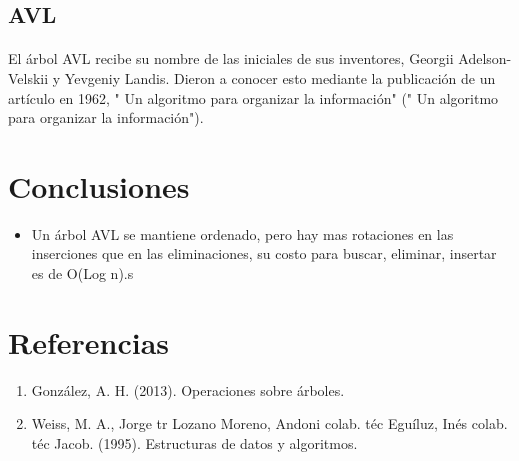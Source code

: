 \documentclass{article}
\begin{document}
    \subsection{AVL}
        \paragraph{}
        El árbol AVL recibe su nombre de las iniciales  de sus inventores, Georgii Adelson-Velskii y Yevgeniy Landis. Dieron a conocer esto mediante la publicación de un artículo en 1962, " Un algoritmo para organizar la información" (" Un algoritmo para organizar la información").
 
 

    \section{Conclusiones}
        \begin{itemize}
                 \item Un árbol AVL se mantiene ordenado, pero hay mas rotaciones en las inserciones que en las eliminaciones, su costo para buscar, eliminar, insertar  es de O(Log n).s
        \end{itemize}
    \section{Referencias}
  \begin{enumerate}
    \item González, A. H. (2013). Operaciones sobre árboles.
    \item	Weiss, M. A., Jorge tr Lozano Moreno, Andoni colab. téc Eguíluz,   Inés colab. téc Jacob. (1995). Estructuras de datos y algoritmos.
  \end{enumerate}
\end{document}
